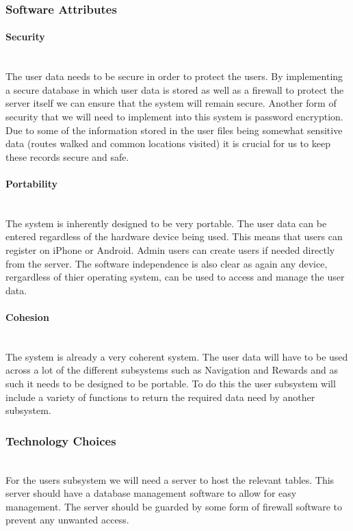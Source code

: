 \subsubsection{Software Attributes}
\paragraph{Security}
\mbox{}\\
The user data needs to be secure in order to protect the users. By implementing a secure database in which user data is stored as well as a firewall to protect the server itself we can ensure that the system will remain secure. Another form of security that we will need to implement into this system is password encryption. Due to some of the information stored in the user files being somewhat sensitive data (routes walked and common locations visited) it is crucial for us to keep these records secure and safe.

\paragraph{Portability}
\mbox{}\\
The system is inherently designed to be very portable. The user data can be entered regardless of the hardware device being used. This means that users can register on iPhone or Android. Admin users can create users if needed directly from the server. The software independence is also clear as again any device,  rergardless of thier operating system, can be used to access and manage the user data. 

\paragraph{Cohesion}
\mbox{}\\
The system is already a very coherent system. The user data will have to be used across a lot of the different subsystems such as Navigation and Rewards and as such it needs to be designed to be portable. To do this the user subsystem will include a variety of functions to return the required data need by another subsystem. 

\subsubsection{Technology Choices}
\mbox{}\\
For the users subsystem we will need a server to host the relevant tables. This server should have a database management software to allow for easy management. The server should be 
guarded by some form of firewall software to prevent any unwanted access. 


